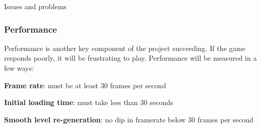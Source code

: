 \documentclass[progress]{cmpreport}
\begin{document}
\begin{section}{Issues and problems}
\subsubsection{Performance}
Performance is another key component of the project succeeding. If the game responds poorly, it will be frustrating to play. Performance will be measured in a few ways:
\newline
\begin{compactitem}
    \item{\textbf{Frame rate}: must be at least 30 frames per second}
    \item{\textbf{Initial loading time}: must take less than 30 seconds}
    \item{\textbf{Smooth level re-generation}: no dip in framerate below 30 frames per second}
\end{compactitem}



\end{section}
\end{document}
